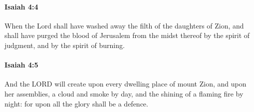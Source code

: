 		\paragraph{Isaiah 4:4} %
			\label{ISAIAH-4-4}

			When the Lord shall have washed away the filth of the daughters of Zion, and shall have purged the blood of Jerusalem from the midst thereof by the spirit of judgment, and by the spirit of burning.


		\paragraph{Isaiah 4:5} %
			\label{ISAIAH-4-5}

			And the LORD will create upon every dwelling place of mount Zion, and upon her assemblies, a cloud and smoke by day, and the shining of a flaming fire by night: for upon all the glory shall be a defence.

